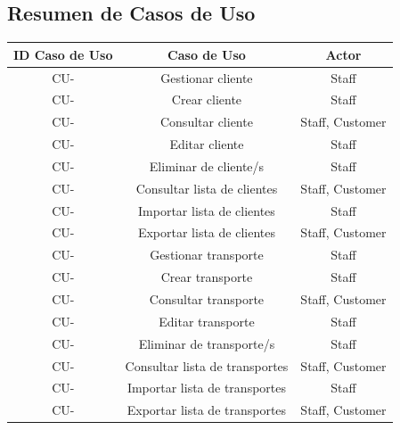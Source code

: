 \documentclass{article}
\begin{document}
    \subsection{Resumen de Casos de Uso}
    \newcommand\rownumber{\stepcounter{magicrownumbers}\arabic{magicrownumbers}}
    \begin{center}
        \begin{longtable}{ |c|c|c| }
            \hline
            
            \rowcolor{lightgray}
            ID Caso de Uso & Caso de Uso & Actor \\
            \endhead
            
            \hline
            \endfoot

            \hline
            CU-\rownumber & Gestionar cliente & Staff \\
            CU-\rownumber & Crear cliente & Staff \\
            CU-\rownumber & Consultar cliente & Staff, Customer \\
            CU-\rownumber & Editar cliente & Staff \\
            CU-\rownumber & Eliminar de cliente/s & Staff \\
            CU-\rownumber & Consultar lista de clientes & Staff, Customer \\
            CU-\rownumber & Importar lista de clientes & Staff \\
            CU-\rownumber & Exportar lista de clientes & Staff, Customer \\

            CU-\rownumber & Gestionar transporte & Staff \\
            CU-\rownumber & Crear transporte & Staff \\
            CU-\rownumber & Consultar transporte & Staff, Customer \\
            CU-\rownumber & Editar transporte & Staff \\
            CU-\rownumber & Eliminar de transporte/s & Staff \\
            CU-\rownumber & Consultar lista de transportes & Staff, Customer \\
            CU-\rownumber & Importar lista de transportes & Staff \\
            CU-\rownumber & Exportar lista de transportes & Staff, Customer \\


\end{longtable}
\end{center}
\end{document}
